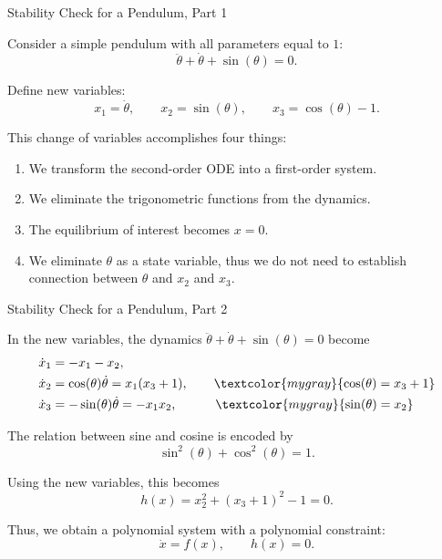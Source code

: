 \documentclass{beamer}
\begin{document}
\begin{frame}{Stability Check for a Pendulum, Part 1}
	\begin{flushleft}
		Consider a simple pendulum with all parameters equal to $1$:
		\[
		\ddot{\theta}+\dot{\theta}+\sin(\theta)=0.
		\]
		
		\bigskip
		
		Define new variables:
		\[
		x_1=\dot{\theta},
		\qquad
		x_2=\sin(\theta),
		\qquad
		x_3=\cos(\theta)-1.
		\]
		
		\bigskip
		
		This change of variables accomplishes four things:
		
		\begin{enumerate}
			\item We transform the second-order ODE into a first-order system.
			
			\item We eliminate the trigonometric functions from the dynamics.
			
			\item The equilibrium of interest becomes $x=0$.
			
			\item We eliminate $\theta$ as a state variable, thus we do not need to establish connection between  $\theta$ and $x_2$ and $x_3$.
		\end{enumerate}
	\end{flushleft}
	
\end{frame}


\begin{frame}{Stability Check for a Pendulum, Part 2}
	\begin{flushleft}
		In the new variables, the dynamics $\ddot{\theta}+\dot{\theta}+\sin(\theta)=0$ become
\[
\begin{aligned}
	\dot{x}_1 &= -x_1-x_2, \\
	\dot{x}_2 &= \cos(\theta)\dot{\theta} = x_1(x_3+1), \qquad  \textcolor{mygray}{\cos(\theta)=x_3+1} \\
	\dot{x}_3 &= -\sin(\theta)\dot{\theta} = -x_1x_2,  \qquad \quad  \textcolor{mygray}{\sin(\theta)=x_2}
\end{aligned}
\]

		
		\bigskip
		
		The relation between sine and cosine is encoded by
		\[
		\sin^2(\theta)+\cos^2(\theta)=1.
		\]
		
		Using the new variables, this becomes
		\[
		h(x)
		=
		x_2^2+(x_3+1)^2-1
		=0.
		\]
		
		\bigskip
		
		Thus, we obtain a polynomial system with a polynomial constraint:
		\[
		\boxed{
			\dot{x}=f(x),
			\qquad
			h(x)=0.
		}
		\]
	\end{flushleft}
\end{frame}
\end{document}
